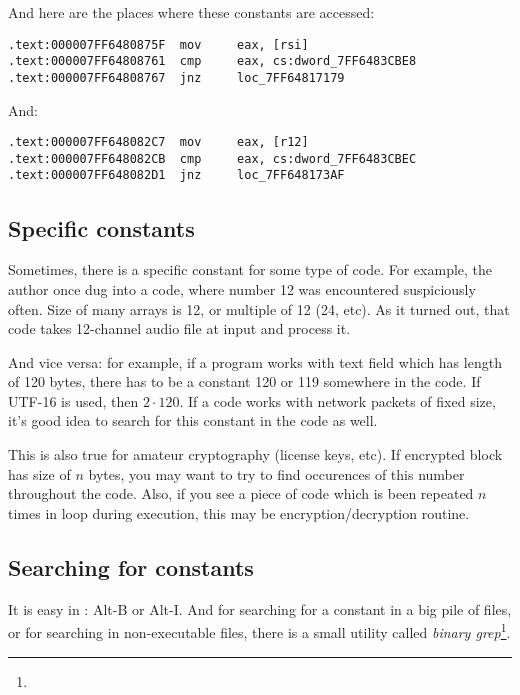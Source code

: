 And here are the places where these constants are accessed:

\begin{lstlisting}[caption=dhcpcore.dll (Windows 7 x64),style=customasmx86]
.text:000007FF6480875F  mov     eax, [rsi]
.text:000007FF64808761  cmp     eax, cs:dword_7FF6483CBE8
.text:000007FF64808767  jnz     loc_7FF64817179
\end{lstlisting}

And:

\begin{lstlisting}[caption=dhcpcore.dll (Windows 7 x64),style=customasmx86]
.text:000007FF648082C7  mov     eax, [r12]
.text:000007FF648082CB  cmp     eax, cs:dword_7FF6483CBEC
.text:000007FF648082D1  jnz     loc_7FF648173AF
\end{lstlisting}

\subsection{Specific constants}

Sometimes, there is a specific constant for some type of code.
For example, the author once dug into a code, where number 12 was encountered suspiciously often.
Size of many arrays is 12, or multiple of 12 (24, etc).
As it turned out, that code takes 12-channel audio file at input and process it.

And vice versa: for example, if a program works with text field which has length of 120 bytes,
there has to be a constant 120 or 119 somewhere in the code.
If UTF-16 is used, then $2 \cdot 120$.
If a code works with network packets of fixed size, it's good idea to search for this constant in the code as well.

This is also true for amateur cryptography (license keys, etc).
If encrypted block has size of $n$ bytes, you may want to try to find occurences of this number throughout the code.
Also, if you see a piece of code which is been repeated $n$ times in loop during execution,
this may be encryption/decryption routine.

\subsection{Searching for constants}

It is easy in \IDA: Alt-B or Alt-I.
And for searching for a constant in a big pile of files, or for searching in non-executable files,
there is a small utility called \emph{binary grep}\footnote{\BGREPURL}.


